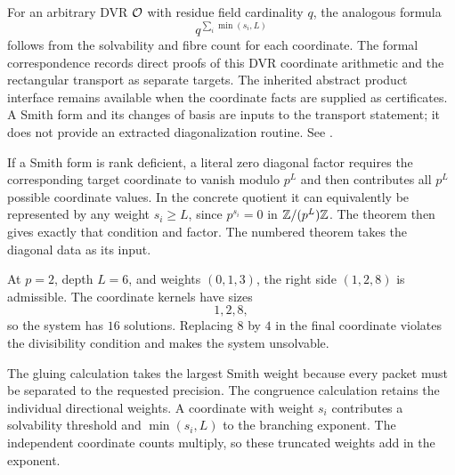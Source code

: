 For an arbitrary DVR ${\mathcal O}$ with residue field cardinality $q$, the analogous
formula
\[
q^{\sum_i\min(s_i,L)}
\]
follows from the solvability and fibre count for each coordinate. The formal
correspondence records direct proofs of this DVR coordinate arithmetic and
the rectangular transport as separate targets.
The inherited abstract product interface remains available when the coordinate
facts are supplied as certificates. A Smith form and its changes of basis are
inputs to the transport statement; it does not provide an extracted
diagonalization routine. See \cite{Serre1979,Lang2002}.

If a Smith form is rank deficient, a literal zero diagonal factor requires
the corresponding target coordinate to vanish modulo $p^L$ and then
contributes all $p^L$ possible coordinate values. In the concrete quotient it
can equivalently be represented by any weight $s_i\ge L$, since
$p^{s_i}=0$ in $\mathbb Z/(p^L)\mathbb Z$. The theorem then gives exactly that condition and
factor. The numbered theorem takes the diagonal data as its input.

\begin{example}
At $p=2$, depth $L=6$, and weights $(0,1,3)$, the right side $(1,2,8)$ is admissible. The coordinate kernels have sizes
\[
1,2,8,
\]
so the system has $16$ solutions. Replacing $8$ by $4$ in the final coordinate violates the divisibility condition and makes the system unsolvable.
\end{example}

\begin{interpretation}
The gluing calculation takes the largest Smith weight because every packet must be separated to the requested precision. The congruence calculation retains the individual directional weights. A coordinate with weight $s_i$ contributes a solvability threshold and $\min(s_i,L)$ to the branching exponent. The independent coordinate counts multiply, so these truncated weights add in the exponent.
\end{interpretation}



